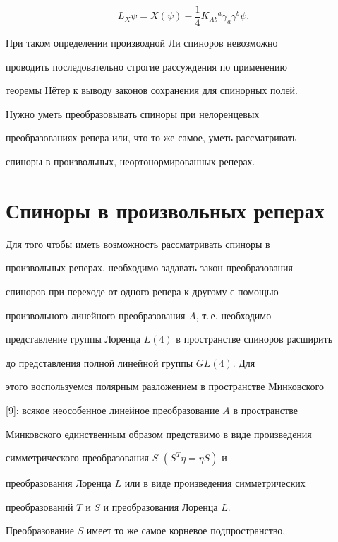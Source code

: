 \begin{equation}


L_X\psi=X(\psi)-\frac{1}{4}K_{Ab}{}^a\gamma_a\gamma^b\psi.


\end{equation}


При таком определении производной Ли спиноров невозможно


проводить последовательно строгие рассуждения по применению


теоремы Н\"етер к выводу законов сохранения для спинорных полей.


Нужно уметь преобразовывать спиноры при нелоренцевых


преобразованиях репера или, что то же самое, уметь рассматривать


спиноры в произвольных, неортонормированных реперах.





\section{Спиноры в произвольных реперах}





Для того чтобы иметь возможность рассматривать спиноры в


произвольных реперах, необходимо задавать закон преобразования


спиноров при переходе от одного репера к другому с помощью


произвольного линейного преобразования $A$, т.\,е. необходимо


представление группы Лоренца $L(4)$ в пространстве спиноров расширить


до представления полной линейной группы $GL(4)$. Для


этого воспользуемся полярным разложением в пространстве Минковского


[9]: всякое неособенное линейное преобразование $A$ в пространстве


Минковского единственным образом представимо в виде произведения


симметрического преобразования $S$ ${(S^T\eta=\eta S)}$ и


преобразования Лоренца $L$ или в виде произведения симметрических


преобразований $T$ и $S$ и преобразования Лоренца $L$.


Преобразование $S$ имеет то же самое корневое подпространство,


